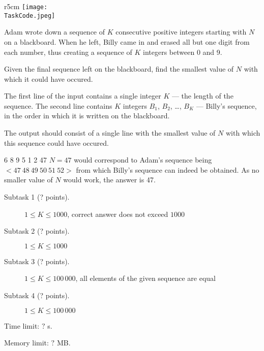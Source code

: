 \documentclass{boi2014}
\renewcommand{\TaskCode}{sequence}
\begin{document}
    \begin{wrapfigure}[5]{r}{5cm}
        \vspace{-24pt}
		\texttt{[image: \\TaskCode.jpeg]}
	\end{wrapfigure}

    Adam wrote down a sequence of $K$ consecutive positive integers starting
    with $N$ on a blackboard. When he left, Billy came in and erased all but one
    digit from each number, thus creating a sequence of $K$ integers between 0
    and 9.

    \Task

    Given the final sequence left on the blackboard, find the smallest
    value of $N$ with which it could have occured.

    \Input

    The first line of the input contains a single integer $K$ --- the length of
    the sequence. The second line contains $K$ integers $B_1$, $B_2$, \dots,
    $B_K$ --- Billy's sequence, in the order in which it is written on the
    blackboard.

    \Output

    The output should consist of a single line with the smallest value of
    $N$ with which this sequence could have occured.

    \Example

    \example
    {
        6 8 9 5 1 2
    }
    {
        47
    }
    {
        $N = 47$ would correspond to Adam's sequence
        being $<47\ 48\ 49\ 50\ 51\ 52>$ from which Billy's sequence
        can indeed be obtained. As no smaller value of $N$
        would work, the answer is 47.
    }

\Scoring

\begin{description}
    \item[Subtask 1 (? points).] $1 \le K \le 1000$, correct
        answer does not exceed $1000$
    \item[Subtask 2 (? points).] $1 \le K \le 1000$
    \item[Subtask 3 (? points).] $1 \le K \le 100\,000$, all
		elements of the given sequence are equal
    \item[Subtask 4 (? points).] $1 \le K \le 100\,000$
\end{description}

\Constraints

Time limit: $?$ s.

Memory limit: $?$ MB.
\end{document}
